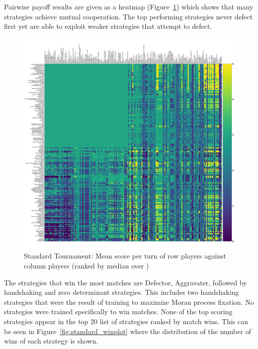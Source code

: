 \documentclass{article}
\begin{document}
Pairwise payoff results are given as a heatmap (Figure~\ref{fig:standard_heatmap})
which shows that many strategies achieve mutual cooperation. The top performing
strategies never defect first yet are able to exploit weaker strategies that
attempt to defect.

\begin{figure}[!hbtp]
    \centering
    \includegraphics[width=\textwidth]{./assets/standard_scores_heatmap.pdf}
    \caption{Standard Tournament: Mean score per turn of row players against
    column players (ranked by median over
        \protecttournaments)}
    \label{fig:standard_heatmap}
\end{figure}

The strategies that win the most matches are Defector, Aggravater, followed by
handshaking and zero determinant strategies. This includes two handshaking
strategies that were the result of training to maximize Moran process fixation.
No strategies were trained specifically to win matches. None of the top scoring
strategies appear in the top 20 list of strategies ranked by match wins.
This can be seen in Figure~\ref{fig:standard_winplot} where the distribution of
the number of wins of each strategy is shown.
\end{document}
